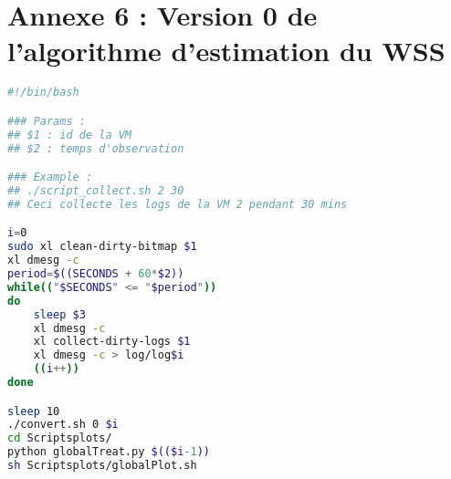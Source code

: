 \section{Annexe 6 : Version 0 de l'algorithme d'estimation du WSS}
\label{section:algo_v0}
\begin{lstlisting}[language=bash, caption=Script de collecte des logs, label={lst:script_collect}]
#!/bin/bash

### Params : 
## $1 : id de la VM
## $2 : temps d'observation

### Example : 
## ./script_collect.sh 2 30 
## Ceci collecte les logs de la VM 2 pendant 30 mins

i=0
sudo xl clean-dirty-bitmap $1
xl dmesg -c
period=$((SECONDS + 60*$2))
while(("$SECONDS" <= "$period"))
do
	sleep $3
	xl dmesg -c
	xl collect-dirty-logs $1
	xl dmesg -c > log/log$i
	((i++))
done

sleep 10
./convert.sh 0 $i
cd Scriptsplots/
python globalTreat.py $(($i-1))
sh Scriptsplots/globalPlot.sh
\end{lstlisting}
